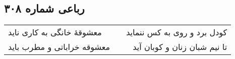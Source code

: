 \begin{center}
\section*{رباعی شماره ۳۰۸}
\label{sec:sh308}
\begin{longtable}{l p{0.5cm} r}
معشوقهٔ خانگی به کاری ناید
&&
کودل برد و روی به کس ننماید
\\
معشوقه خراباتی و مطرب باید
&&
تا نیم شبان زنان و کوبان آید
\\
\end{longtable}
\end{center}
